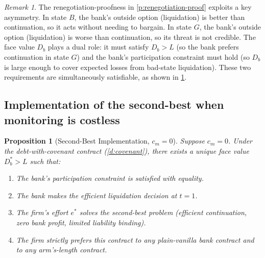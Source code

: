 \documentclass[12pt,a4paper]{article}
\theoremstyle{plain}
\newtheorem{proposition}[theorem]{Proposition}
\theoremstyle{definition}
\theoremstyle{remark}
\newtheorem{remark}[theorem]{Remark}
\begin{document}
\begin{remark}
\label{r:key-asymmetry}
The renegotiation-proofness in \cref{p:renegotiation-proof} exploits a key asymmetry. In state $B$, the bank's outside option (liquidation) is better than continuation, so it acts without needing to bargain. In state $G$, the bank's outside option (liquidation) is worse than continuation, so its threat is not credible. The face value $D_b$ plays a dual role: it must satisfy $D_b > L$ (so the bank prefers continuation in state $G$) and the bank's participation constraint must hold (so $D_b$ is large enough to cover expected losses from bad-state liquidation). These two requirements are simultaneously satisfiable, as shown in \cref{p:covenant-implements}.
\end{remark}

\subsection{Implementation of the second-best when monitoring is costless}
\label{sec:costless}

\begin{proposition}[Second-Best Implementation, $c_m = 0$]
\label{p:covenant-implements}
Suppose $c_m = 0$. Under the debt-with-covenant contract (\cref{d:covenant}), there exists a unique face value $D_b^* > L$ such that:
\begin{enumerate}[nosep,label=(\alph*)]
\item The bank's participation constraint is satisfied with equality.
\item The bank makes the efficient liquidation decision at $t = 1$.
\item The firm's effort $e^*$ solves the second-best problem (efficient continuation, zero bank profit, limited liability binding).
\item The firm strictly prefers this contract to any plain-vanilla bank contract and to any arm's-length contract.
\end{enumerate}
\end{proposition}
\end{document}
